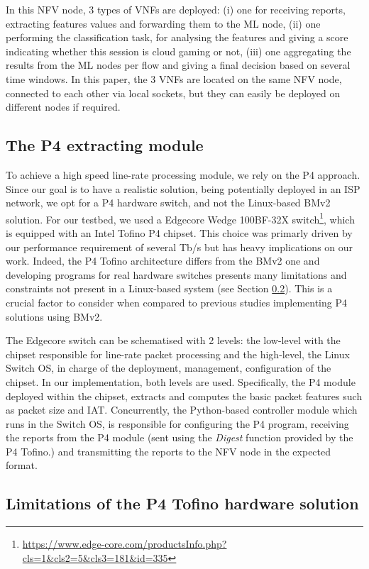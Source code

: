 In this NFV node, 3 types of VNFs are deployed: (i) one for receiving reports, extracting features values and forwarding them to the ML node, (ii) one performing the classification task, for analysing the features and giving a score indicating whether this session is cloud gaming or not, (iii) one aggregating the results from the ML nodes per flow and giving a final decision based on several time windows. In this paper, the 3 VNFs are located on the same NFV node, connected to each other via local sockets, but they can easily be deployed on different nodes if required. 

\subsection{The P4 extracting module}

To achieve a high speed line-rate processing module, we rely on the P4 approach. Since our goal is to have a realistic solution, being potentially deployed in an ISP network, we opt for a P4 hardware switch, and not the Linux-based BMv2 solution. For our testbed, we used a Edgecore Wedge 100BF-32X switch\footnote{\url{https://www.edge-core.com/productsInfo.php?cls=1&cls2=5&cls3=181&id=335}}, which is equipped with an Intel Tofino P4 chipset. This choice was primarly driven by our performance requirement of several Tb/s but has heavy implications on our work. Indeed, the P4 Tofino architecture differs from the BMv2 one and developing programs for real hardware switches presents many limitations and constraints not present in a Linux-based system (see Section \ref{chap_4:sec:limitations_P4}). This is a crucial factor to consider when compared to previous studies implementing P4 solutions using BMv2.

The Edgecore switch can be schematised with 2 levels: the low-level with the chipset responsible for line-rate packet processing and the high-level, the Linux Switch OS, in charge of the deployment, management, configuration of the chipset. In our implementation, both levels are used. Specifically, the P4 module deployed within the chipset, extracts and computes the basic packet features such as packet size and IAT. Concurrently, the Python-based controller module which runs in the Switch OS, is responsible for configuring the P4 program, receiving the reports from the P4 module (sent using the \emph{Digest} function provided by the P4 Tofino.) and transmitting the reports to the NFV node in the expected format.

\subsection{Limitations of the P4 Tofino hardware solution}
\label{chap_4:sec:limitations_P4}


